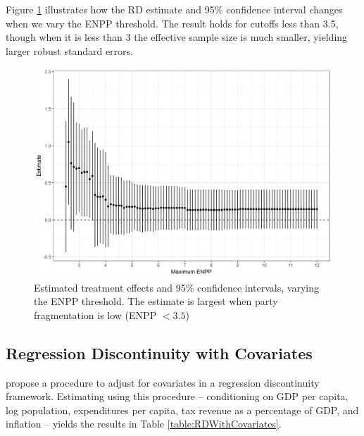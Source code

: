 \documentclass[12pt]{article}
\begin{document}
\begin{appendices}
	Figure \ref{fig:rdEstimateVaryingENPP} illustrates how the RD estimate and 95\% confidence interval changes when we vary the ENPP threshold. The result holds for cutoffs less than 3.5, though when it is less than 3 the effective sample size is much smaller, yielding larger robust standard errors. 
	
	\begin{figure}[h]
		\centering
		\includegraphics[width=\linewidth]{Figures/rdEstimateVaryingENPP}
		\caption{Estimated treatment effects and 95\% confidence intervals, varying the ENPP threshold. The estimate is largest when party fragmentation is low (ENPP $< 3.5$)}
		\label{fig:rdEstimateVaryingENPP}
	\end{figure}

	\subsection{Regression Discontinuity with Covariates}
	
	\citet{Calonico2018} propose a procedure to adjust for covariates in a regression discontinuity framework. Estimating using this procedure -- conditioning on GDP per capita, log population, expenditures per capita, tax revenue as a percentage of GDP, and inflation -- yields the results in Table \ref{table:RDWithCovariates}. 
	

\end{appendices}
\end{document}
